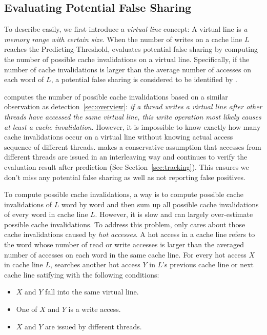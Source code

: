 \subsection{Evaluating Potential False Sharing}
\label{sec:evaluatingfs}
To describe easily, we first introduce a {\it virtual line} concept:
A virtual line is {\it a memory range with certain size}.
When the number of writes on a cache line $L$ reaches the Predicting-Threshold,
 evaluates potential false sharing by computing the number of possible cache 
invalidations on a virtual line. Specifically, if the number of cache
invalidations is larger than the average number of accesses
on each word of $L$, a potential false sharing is considered to
be identified by .

 computes the number of possible cache invalidations based on a 
similar observation as detection~\ref{sec:overview}: 
{\it if a thread writes a virtual line after other threads 
have accessed the same virtual line, this write operation most likely causes at least a cache 
invalidation}. 
However, it is impossible to know exactly how many cache invalidations occur on a virtual
line without knowing actual access sequence of different threads.  
 makes a conservative assumption that 
accesses from different threads are issued in an interleaving way and
continues to verify the evaluation result after prediction (See Section~\ref{sec:tracking}).
This ensures we don't miss any potential false sharing as well as 
not reporting false positives.

To compute possible cache invalidations, a way is to compute possible 
cache invalidations of $L$ word by word and then sum up all possible cache invalidations 
of every word in cache line $L$. 
However, it is slow and can largely over-estimate possible cache invalidations.
To address this problem,  only cares about those cache invalidations caused by
{\it hot accesses}. A hot access in a cache line refers to the word whose number of read or write accesses 
is larger than the averaged number of accesses on each word in the same cache line.
For every hot access $X$ in cache line $L$,  searches another
hot access $Y$ in $L$'s previous cache line or next cache line satifying with
the following conditions: 

\begin{itemize}
\item
$X$ and $Y$ fall into the same virtual line. 

\item
One of $X$ and $Y$ is a write access.

\item 
$X$ and $Y$ are issued by different threads.

\end{itemize}

